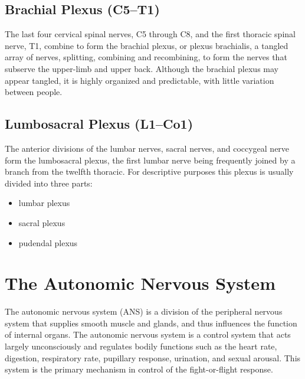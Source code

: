 \hypertarget{brachial-plexus-c5t1}{%
\subsection{Brachial Plexus (C5--T1)}\label{brachial-plexus-c5t1}}

The last four cervical spinal nerves, C5 through C8, and the first thoracic spinal nerve, T1, combine to form the brachial plexus, or plexus brachialis, a tangled array of nerves, splitting, combining and recombining, to form the nerves that subserve the upper-limb and upper back. Although the brachial plexus may appear tangled, it is highly organized and predictable, with little variation between people.

\hypertarget{lumbosacral-plexus-l1co1}{%
\subsection{Lumbosacral Plexus (L1--Co1)}\label{lumbosacral-plexus-l1co1}}

The anterior divisions of the lumbar nerves, sacral nerves, and coccygeal nerve form the lumbosacral plexus, the first lumbar nerve being frequently joined by a branch from the twelfth thoracic. For descriptive purposes this plexus is usually divided into three parts:

\begin{itemize}
\tightlist
\item
  lumbar plexus
\item
  sacral plexus
\item
  pudendal plexus
\end{itemize}

\hypertarget{the-autonomic-nervous-system}{%
\section{The Autonomic Nervous System}\label{the-autonomic-nervous-system}}

The autonomic nervous system (ANS) is a division of the peripheral nervous system that supplies smooth muscle and glands, and thus influences the function of internal organs. The autonomic nervous system is a control system that acts largely unconsciously and regulates bodily functions such as the heart rate, digestion, respiratory rate, pupillary response, urination, and sexual arousal. This system is the primary mechanism in control of the fight-or-flight response.

